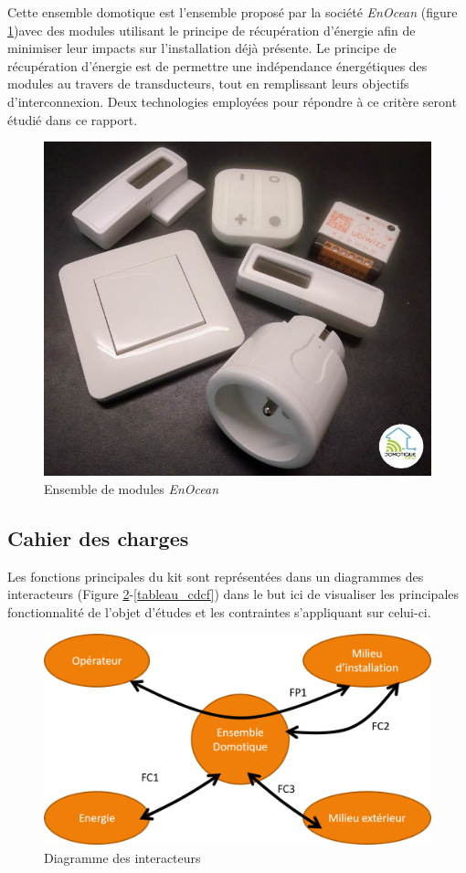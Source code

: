 \documentclass{rapportENS}
\begin{document}
 Cette ensemble domotique est l'ensemble proposé par la société \textit{EnOcean} (figure \ref{fig:kit_enOcean})avec des modules utilisant le principe de récupération d'énergie afin de minimiser leur impacts sur l'installation déjà présente. Le principe de récupération d'énergie est de permettre une indépendance énergétiques des modules au travers de transducteurs, tout en remplissant leurs objectifs d'interconnexion. Deux technologies employées pour répondre à ce critère seront étudié dans ce rapport. 
 
 \begin{figure}[h!]
     \centering
     \includegraphics[scale=0.5]{kit_enocean.jpg}
     \caption{Ensemble de modules \textit{EnOcean}}
     \label{fig:kit_enOcean}
 \end{figure}
 
 \subsection{Cahier des charges}
 Les fonctions principales du kit sont représentées dans un diagrammes des interacteurs (Figure \ref{fig:Inter-acteurs}-\ref{tableau_cdcf}) dans le but ici de visualiser les principales fonctionnalité de l'objet d'études et les contraintes s'appliquant sur celui-ci.
 \begin{figure}[h!]
     \centering
     \includegraphics[width=0.9\linewidth]{Graphe_cdcdf.png}
     \caption{Diagramme des interacteurs}
     \label{fig:Inter-acteurs}
     \end{figure}
     
\end{document}
